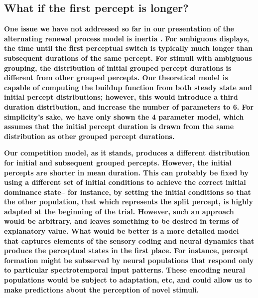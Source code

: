 \documentclass[10pt]{article}
\begin{document}

\subsection*{What if the first percept is longer?}
\textbf{One issue we have not addressed so far in our presentation of the alternating renewal process model is inertia \cite{Hupe2012}. For ambiguous displays, the time until the first perceptual switch is typically much longer than subsequent durations of the same percept. For stimuli with ambiguous grouping, the distribution of initial grouped percept durations is different from other grouped percepts. Our theoretical model is capable of computing the buildup function from both steady state and initial percept distributions; however, this would introduce a third duration distribution, and increase the number of parameters to 6. For simplicity's sake, we have only shown the 4 parameter model, which assumes that the initial percept duration is drawn from the same distribution as other grouped percept durations.}

\textbf{Our competition model, as it stands, produces a different distribution for initial and subsequent grouped percepts. However, the initial percepts are shorter in mean duration. This can probably be fixed by using a different set of initial conditions to achieve the correct initial dominance state-- for instance, by setting the initial conditions so that the other population, that which represents the split percept, is highly adapted at the beginning of the trial. However, such an approach would be arbitrary, and leaves something to be desired in terms of explanatory value. What would be better is a more detailed model that captures elements of the sensory coding and neural dynamics that produce the perceptual states in the first place. For instance, percept formation might be subserved by neural populations that respond only to particular spectrotemporal input patterns. These encoding neural populations would be subject to adaptation, etc, and could allow us to make predictions about the perception of novel stimuli.}
\end{document}
